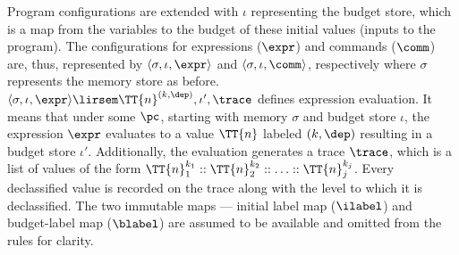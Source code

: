 Program configurations are extended with $\iota$ representing the
budget store, which is a map from the variables to the budget of these
initial  values (inputs to the program). The configurations for
expressions ($\expr$) and commands ($\comm$) are, thus, represented
by $\langle \sigma, \iota, \expr \rangle$ and $\langle \sigma, \iota, 
\comm \rangle$, respectively where $\sigma$ represents the memory
store as before. 
$\langle\sigma, \iota, \expr \rangle \lirsem \TT{n}^{(k, \dep)}, \iota',
\trace$ defines expression evaluation. It means that under some
$\pc$, starting with memory $\sigma$ and budget store $\iota$, the
expression $\expr$ evaluates to a value $\TT{n}$ labeled
$(k, \dep)$ resulting in a budget store $\iota'$. Additionally, the
evaluation generates a trace $\trace$, which is a list of values of the
form $\TT{n}_1^{k_1} :: \TT{n}_2^{k_2} :: \ldots ::
\TT{n}_j^{k_j}$. Every declassified value is recorded on the trace along
with the level to which it is declassified. The two immutable maps ---
initial label map ($\ilabel$) and budget-label map ($\blabel$) are
assumed to be available and omitted from the rules for clarity.

